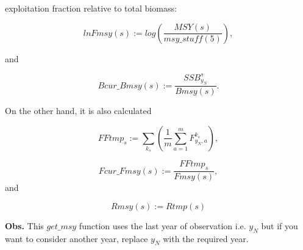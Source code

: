 \documentclass{article}
\begin{document}
exploitation fraction relative to total biomass:

\begin{equation}
    lnFmsy(s)   := log\left(\dfrac{MSY(s)}{msy\_stuff(5)}\right),
\end{equation}

and

\begin{equation}
    Bcur\_Bmsy(s):= \dfrac{SSB^s_{y_N}}{Bmsy(s)}.
\end{equation}

On the other hand, it is also calculated

\begin{equation}
    FFtmp_s:=\sum_{k_s}\left(\dfrac{1}{m}\sum_{a=1}^mF^{k_s}_{y_N,a}\right),
\end{equation}

\begin{equation}
    Fcur\_Fmsy(s):= \dfrac{FFtmp_s}{Fmsy(s)},
\end{equation}
and 

\begin{equation}
    Rmsy(s)     := Rtmp(s)
\end{equation}

\textbf{Obs.} This $get\_msy$ function uses the last year of observation i.e. $y_N$ but if you want to consider another year, replace $y_N$ with the required year.
\end{document}
